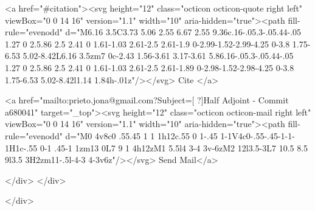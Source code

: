       <a  href="#citation"><svg height="12" class="octicon octicon-quote right left" viewBox="0 0 14 16" version="1.1" width="10" aria-hidden="true"><path fill-rule="evenodd" d="M6.16 3.5C3.73 5.06 2.55 6.67 2.55 9.36c.16-.05.3-.05.44-.05 1.27 0 2.5.86 2.5 2.41 0 1.61-1.03 2.61-2.5 2.61-1.9 0-2.99-1.52-2.99-4.25 0-3.8 1.75-6.53 5.02-8.42L6.16 3.5zm7 0c-2.43 1.56-3.61 3.17-3.61 5.86.16-.05.3-.05.44-.05 1.27 0 2.5.86 2.5 2.41 0 1.61-1.03 2.61-2.5 2.61-1.89 0-2.98-1.52-2.98-4.25 0-3.8 1.75-6.53 5.02-8.42l1.14 1.84h-.01z"/></svg> Cite
      </a>

      <a href="mailto:prieto.jona@gmail.com?Subject=[ ?]Half Adjoint - Commit a680041" target="_top"><svg height="12" class="octicon octicon-mail right left" viewBox="0 0 14 16" version="1.1" width="10" aria-hidden="true"><path fill-rule="evenodd" d="M0 4v8c0 .55.45 1 1 1h12c.55 0 1-.45 1-1V4c0-.55-.45-1-1-1H1c-.55 0-1 .45-1 1zm13 0L7 9 1 4h12zM1 5.5l4 3-4 3v-6zM2 12l3.5-3L7 10.5 8.5 9l3.5 3H2zm11-.5l-4-3 4-3v6z"/></svg> Send Mail</a>

    </div>
  </div>

</div>




